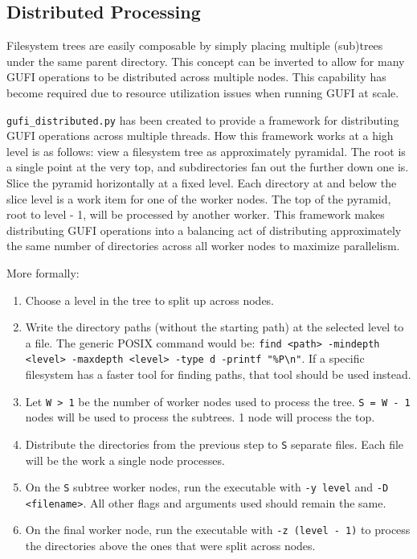 \subsection{Distributed Processing}

Filesystem trees are easily composable by simply placing multiple
(sub)trees under the same parent directory. This concept can be
inverted to allow for many GUFI operations to be distributed across
multiple nodes. This capability has become required due to resource
utilization issues when running GUFI at scale.

\texttt{gufi\_distributed.py} has been created to provide a framework
for distributing GUFI operations across multiple threads. How this
framework works at a high level is as follows: view a filesystem tree
as approximately pyramidal. The root is a single point at the very
top, and subdirectories fan out the further down one is. Slice the
pyramid horizontally at a fixed level. Each directory at and below the
slice level is a work item for one of the worker nodes. The top of the
pyramid, root to level - 1, will be processed by another worker. This
framework makes distributing GUFI operations into a balancing act of
distributing approximately the same number of directories across all
worker nodes to maximize parallelism.

More formally:

\begin{enumerate}
\item Choose a level in the tree to split up across nodes.
\item Write the directory paths (without the starting path) at the
  selected level to a file. The generic POSIX command would be:
  \texttt{find <path> -mindepth <level> -maxdepth <level> -type d
    -printf "\%P\textbackslash n"}. If a specific filesystem has a
  faster tool for finding paths, that tool should be used instead.
\item Let \texttt{W > 1} be the number of worker nodes used to process
  the tree. \texttt{S~=~W~-~1} nodes will be used to process the
  subtrees. 1 node will process the top.
\item Distribute the directories from the previous step to \texttt{S}
  separate files. Each file will be the work a single node processes.
\item On the \texttt{S} subtree worker nodes, run the executable with
  \texttt{-y level} and \texttt{-D <filename>}. All other flags and
  arguments used should remain the same.
\item On the final worker node, run the executable with \texttt{-z
  (level - 1)} to process the directories above the ones that were
  split across nodes.
\end{enumerate}

